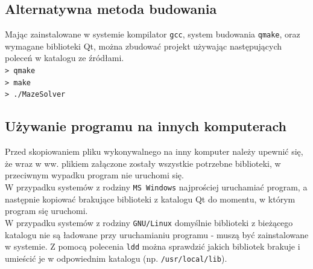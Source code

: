 \documentclass[12pt,a4paper]{article}
\begin{document}
	\subsection{Alternatywna metoda budowania}
	
	Mając zainstalowane w systemie kompilator \texttt{gcc}, system budowania
	\texttt{qmake}, oraz wymagane biblioteki Qt, można zbudować projekt używając
	następujących poleceń w katalogu ze źródłami.\\
	\texttt{> qmake}\\
	\texttt{> make} \\
	\texttt{> ./MazeSolver} \\
	
	\subsection{Używanie programu na innych komputerach}
	Przed skopiowaniem pliku wykonywalnego na inny komputer należy upewnić się,
	że wraz w ww. plikiem załączone zostały wszystkie potrzebne biblioteki, w
	przeciwnym wypadku program nie uruchomi się.\\
	
	W przypadku systemów z rodziny \texttt{MS Windows} najprościej uruchamiać
	program, a następnie kopiować brakujące biblioteki z katalogu Qt do momentu, w
	którym program się uruchomi.\\
	
	W przypadku systemów z rodziny \texttt{GNU/Linux} domyślnie biblioteki z 
	bieżącego katalogu nie są ładowane przy uruchamianiu programu - muszą być
	zainstalowane w systemie. Z pomocą polecenia \texttt{ldd} można sprawdzić
	jakich bibliotek brakuje i umieścić je w odpowiednim katalogu (np. \texttt{/usr/local/lib}).
\end{document}
